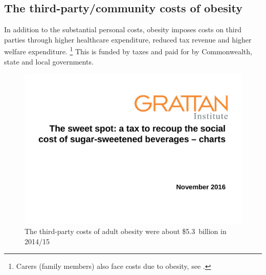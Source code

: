\documentclass[embargoed]{grattan}
\begin{document}
\subsection{The third-party/community costs of obesity}\label{the-third-partysocial-costs-of-obesity}

In addition to the substantial personal costs, obesity imposes costs on third parties through higher healthcare expenditure, reduced tax revenue and higher welfare expenditure.%
\footnote{Carers (family members) also face costs due to obesity, see \textcite{Freebairn2010Taxationobesity}.} This is funded by taxes and paid for by Commonwealth, state and local governments.

\begin{figure}
\caption{The third-party costs of adult obesity were about \$5.3~billion in 2014/15}\label{fig:3rd-party-costs-adult-obesity-were-5bn}

\includegraphics[page=4]{atlas/ObesityCharts}


\end{figure}
\end{document}
